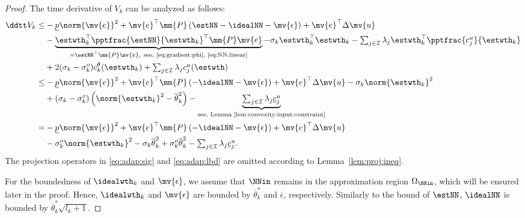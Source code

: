 \documentclass[letterpaper, journal]{IEEEtran}
\begin{document}
\begin{proof}
The time derivative of $V_{k}$ can be analyzed as follows:
\begin{align} \label{eq:Vk:dot:1} \nonumber
  \ddtt V_{k}
  \le&
  -\underline{p}
  \norm{\mv{e}}^2
  +
  \mv{e}^\top\mm{P}
  \left(
    \estNN - \idealNN
    - \mv{\epsilon}
  \right)
  +
  \mv{e}^\top
  \Delta \mv{u}
  \\ \nonumber
  &
  -
  \underbrace{
    \estwth_k^\top
    \pptfrac{\estNN}{\estwth_k}^\top
    \mm{P}
    \mv{e}
  }_{
    = 
    \estNN^\top\mm{P}\mv{e}
    ,\ \text{see, \eqref{eq:gradient:phi}, \eqref{eq:NN:linear}}
  }
  -
  \sigma_k
  \estwth_k^\top
  \estwth_k
  -    
  \textstyle\sum_{j\in\mathcal{I}}
  \lambda_j
  \estwth_k^\top
  \pptfrac{c^{u}_j}{\estwth_k}
  \\ %
  &
  +
  2(\sigma_k-\sigma_k^o) c_k^{\theta}(\estwth_k)
  +
  \textstyle\sum_{j\in\mathcal{I}}
  \lambda_j c^{u}_j(\estwth)
  \\ \nonumber
  \le&
  -\underline{p}
  \norm{\mv{e}}^2
  +
  \mv{e}^\top
  \mm{P}
  \left(
    - \idealNN
    - \mv{\epsilon}
  \right)
  +
  \mv{e}^\top
  \Delta \mv{u}
  -
  \sigma_k \norm{\estwth_k}^2
  \\ \nonumber
  &
  +
  (\sigma_k-\sigma_k^o) 
  \left(
    \norm{\estwth_k}^2
    -
    \overline{\theta}_k^{2}
  \right)
  -
  \underbrace{
    \textstyle\sum_{j\in\mathcal{I}}
    \lambda_j
    \underline{c}_j^u 
  }_{\text{see, Lemma~\ref{lem:convexity:input:constraint}}}
  \\ \nonumber
  =&
  -\underline{p}
  \norm{\mv{e}}^2
  +
  \mv{e}^\top
  \mm{P}
  \left(
    - \idealNN
    - \mv{\epsilon}
  \right)
  +
  \mv{e}^\top
  \Delta \mv{u}
  \\ \nonumber
  &
  -
  \sigma_k^o
  \norm{\estwth_k}^2
  -
  \sigma_k
  \overline{\theta}_k^2
  +
  \sigma_k^o
  \overline{\theta}_k^2
  -
  \textstyle\sum_{j\in\mathcal{I}}
  \lambda_j
  \underline{c}_j^u 
  .
\end{align}
The projection operators in \eqref{eq:adap:sig} and \eqref{eq:adap:lbd} are omitted according to Lemma~\ref{lem:proj:ineq}.

For the boundedness of $\idealwth_k$ and $\mv{\epsilon}$, we assume that $\NNin$ remains in the approximation region $\Omega_{\NNin}$, which will be ensured later in the proof.
Hence, $\idealwth_k$ and $\mv{\epsilon}$ are bounded by $\overline{\theta}_k^*$ and $\overline{\epsilon}$, respectively.
Similarly to the bound of $\estNN$, $\idealNN$ is bounded by $\overline{\theta}_k^* \sqrt{l_k+1}$.


\end{proof}
\end{document}
